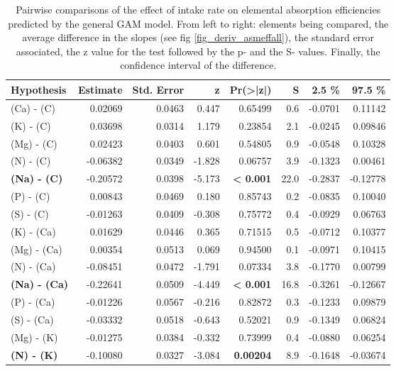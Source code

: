 \begin{table}[H]
\centering
\caption{\label{supptable:table_pairs_d_ae} Pairwise comparisons of the effect of intake rate on elemental absorption efficiencies predicted by the general GAM model. From left to right: elements being compared, the average difference in the slopes (see fig \ref{fig_deriv_asmeffall}), the standard error associated, the z value for the test followed by the p- and the S- values. Finally, the confidence interval of the difference.}
\centering
\begin{tabular}[t]{>{}lrrr>{}rrrr}
\toprule
\textbf{ Hypothesis  } & \textbf{ Estimate } & \textbf{ Std. Error } & \textbf{ z      } & \textbf{ Pr(>|z|) } & \textbf{ S    } & \textbf{ 2.5 \%   } & \textbf{ 97.5 \%   }\\
\midrule
(Ca) - (C) & 0.02069 & 0.0463 & 0.447 & 0.65499 & 0.6 & -0.0701 & 0.11142\\
(K) - (C) & 0.03698 & 0.0314 & 1.179 & 0.23854 & 2.1 & -0.0245 & 0.09846\\
(Mg) - (C) & 0.02423 & 0.0403 & 0.601 & 0.54805 & 0.9 & -0.0548 & 0.10328\\
(N) - (C) & -0.06382 & 0.0349 & -1.828 & 0.06757 & 3.9 & -0.1323 & 0.00461\\
\textbf{(Na) - (C)} & -0.20572 & 0.0398 & -5.173 & \textbf{< 0.001} & 22.0 & -0.2837 & -0.12778\\
(P) - (C) & 0.00843 & 0.0469 & 0.180 & 0.85743 & 0.2 & -0.0835 & 0.10040\\
(S) - (C) & -0.01263 & 0.0409 & -0.308 & 0.75772 & 0.4 & -0.0929 & 0.06763\\
(K) - (Ca) & 0.01629 & 0.0446 & 0.365 & 0.71515 & 0.5 & -0.0712 & 0.10377\\
(Mg) - (Ca) & 0.00354 & 0.0513 & 0.069 & 0.94500 & 0.1 & -0.0971 & 0.10415\\
(N) - (Ca) & -0.08451 & 0.0472 & -1.791 & 0.07334 & 3.8 & -0.1770 & 0.00799\\
\textbf{(Na) - (Ca)} & -0.22641 & 0.0509 & -4.449 & \textbf{< 0.001} & 16.8 & -0.3261 & -0.12667\\
(P) - (Ca) & -0.01226 & 0.0567 & -0.216 & 0.82872 & 0.3 & -0.1233 & 0.09879\\
(S) - (Ca) & -0.03332 & 0.0518 & -0.643 & 0.52021 & 0.9 & -0.1349 & 0.06824\\
(Mg) - (K) & -0.01275 & 0.0384 & -0.332 & 0.73999 & 0.4 & -0.0880 & 0.06254\\
\textbf{(N) - (K)} & -0.10080 & 0.0327 & -3.084 & \textbf{0.00204} & 8.9 & -0.1648 & -0.03674\\

\end{tabular}
\end{table}
